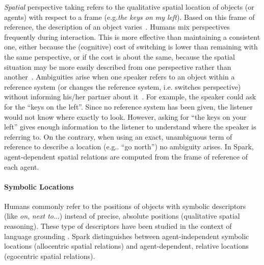 \documentclass[preprint,3p,times]{elsarticle}
\newcommand{\ie}{i.e.\xspace}
\newcommand{\eg}{e.g.\xspace}
\begin{document}
\emph{Spatial} perspective taking refers to the qualitative spatial location of
objects (or agents) with respect to a frame (\eg \emph{the keys on my left}).
Based on this frame of reference, the description of an object
varies~\cite{Marin2008}. Humans mix perspectives frequently during interaction.
This is more effective than maintaining a consistent one, either because the
(cognitive) cost of switching is lower than remaining with the same
perspective, or if the cost is about the same, because the spatial situation
may be more easily described from one perspective rather than
another~\cite{Tversky1999}. Ambiguities arise when one speaker refers to an
object within a reference system (or changes the reference system, \ie switches
perspective) without informing his/her partner about it~\cite{Breazeal2006,
Ros2010}. For example, the speaker could ask for the ``keys on the left''.
Since no reference system has been given, the listener would not know where
exactly to look.  However, asking for ``the keys on your left'' gives enough
information to the listener to understand where the speaker is referring to. On
the contrary, when using an exact, unambiguous term of reference to describe a
location (\eg. ``go north'') no ambiguity arises.
In {\sc Spark}, agent-dependent spatial relations are computed from the frame of
reference of each agent.

\paragraph{Symbolic Locations}

Humans commonly refer to the positions of objects with symbolic descriptors
(like \emph{on}, \emph{next to}...) instead of precise, absolute positions
(qualitative spatial reasoning). These type of descriptors have been studied in the context of language grounding
\cite{O'Keefe1999,Matuszek2010,Regier2001,Kelleher2006,Blisard2005}.  {\sc
Spark} distinguishes between agent-independent symbolic locations (allocentric
spatial relations) and agent-dependent, relative locations (egocentric spatial
relations).
\end{document}
